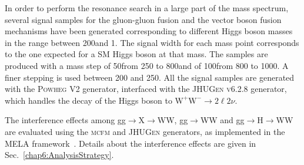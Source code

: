 In order to perform the resonance search in a large part of the mass spectrum, several signal samples for the gluon-gluon fusion and the vector boson fusion mechanisms have been generated corresponding to different Higgs boson masses in the range between 200\GeV and 1\TeV. The signal width for each mass point corresponds to the one expected for a SM Higgs boson at that mass. The samples are produced with a mass step of 50\GeV from 250 to 800\GeV and of 100\GeV from 800 to 1000\GeV. A finer stepping is used between 200 and 250\GeV. All the signal samples are generated with the \textsc{Powheg V2} generator, interfaced with the \textsc{JHUGen v6.2.8} generator, which handles the decay of the Higgs boson to $\mathrm{W^+ W^-}\to2\ell2\nu$.

The interference effects among gg$\to$X$\to$WW, gg$\to$WW and gg$\to$H$\to$WW are evaluated using the  \textsc{mcfm} and \textsc{JHUGen} generators, as implemented in the MELA framework~\cite{JHUGen}. Details about the interference effects are given in Sec.~\ref{chap6:AnalysisStrategy}.
